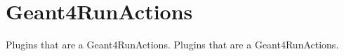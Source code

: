\hypertarget{group___geant4_run_actions}{
\section{Geant4RunActions}
\label{group___geant4_run_actions}
}


Plugins that are a Geant4RunActions.  
Plugins that are a Geant4RunActions. 
